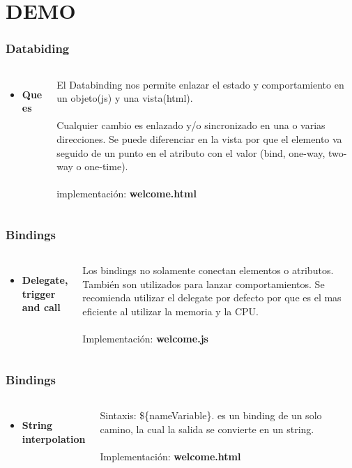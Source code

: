 \documentclass{beamer}
\begin{document}
\section{DEMO}
\begin{frame}
\frametitle{Databiding}
\begin{columns}[c]
\begin{itemize}
\item \textbf{Que es}
\end{itemize}
El Databinding nos permite enlazar el estado y comportamiento en un objeto(js) y una vista(html).
\\~\\
Cualquier cambio es enlazado y/o sincronizado en una o varias direcciones. Se puede diferenciar en la vista por que el elemento va seguido de un punto en el atributo con el valor (bind, one-way, two-way o one-time).
\\~\\
implementaci\'on: \textbf{welcome.html}
\end{columns}
\end{frame}
\begin{frame}
\frametitle{Bindings}
\begin{columns}[c]
\begin{itemize}
\item \textbf{Delegate, trigger and call}
\end{itemize}
Los bindings no solamente conectan elementos o atributos. Tambi\'en son utilizados para lanzar comportamientos.
Se recomienda utilizar el delegate por defecto por que es el mas eficiente al utilizar la memoria y la CPU.
\\~\\
Implementaci\'on: \textbf{welcome.js}
\end{columns}
\end{frame}
\begin{frame}
\frametitle{Bindings}
\begin{columns}[c]
\begin{itemize}
\item \textbf{String interpolation}
\end{itemize}
Sintaxis: \$\{nameVariable\}. es un binding de un solo camino, la cual la salida se convierte en un string.
\\~\\
Implementaci\'on: \textbf{welcome.html}
\end{columns}
\end{frame}
\end{document}
